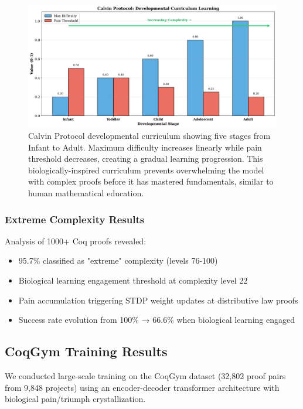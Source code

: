 \documentclass[12pt]{article}
\begin{document}
\begin{figure}[h]
\centering
\includegraphics[width=\textwidth]{figure4_calvin_stages.png}
\caption{Calvin Protocol developmental curriculum showing five stages from Infant to Adult. Maximum difficulty increases linearly while pain threshold decreases, creating a gradual learning progression. This biologically-inspired curriculum prevents overwhelming the model with complex proofs before it has mastered fundamentals, similar to human mathematical education.}
\label{fig:calvin}
\end{figure}

\subsubsection{Extreme Complexity Results}

Analysis of 1000+ Coq proofs revealed:
\begin{itemize}
\item 95.7\% classified as "extreme" complexity (levels 76-100)
\item Biological learning engagement threshold at complexity level 22
\item Pain accumulation triggering STDP weight updates at distributive law proofs
\item Success rate evolution from 100\% → 66.6\% when biological learning engaged
\end{itemize}

\subsection{CoqGym Training Results}

We conducted large-scale training on the CoqGym dataset (32,802 proof pairs from 9,848 projects) using an encoder-decoder transformer architecture with biological pain/triumph crystallization.
\end{document}
